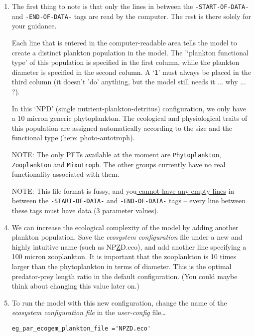 \documentclass[11pt,fleqn]{book} %
\begin{document}
\begin{enumerate}[noitemsep]
\vspace{1mm}
\item The first thing to note is that only the lines in between the \texttt{\small -START-OF-DATA-} and \texttt{\small -END-OF-DATA-} tags are read by the computer. The rest is there solely for your guidance.

Each line that is entered in the computer-readable area tells the model to create a distinct plankton population in the model. The '`plankton functional type' of this population is specified in the first column, while the plankton diameter is specified in the second column. A `\texttt{1}' must always be placed in the third column (it doesn't 'do' anything, but the model still needs it ...  why ... ?).

In this `NPD' (single nutrient-plankton-detritus) configuration, we only have a 10 micron generic phytoplankton. The ecological and physiological traits of this population are assigned automatically according to the size and the functional type (here: photo-autotroph).

\item[NOTE:] The only PFTs available at the moment are \texttt{Phytoplankton}, \texttt{Zooplankton} and \texttt{Mixotroph}. The other groups currently have no real functionality associated with them.

\item[NOTE:] This file format is fussy, and you\uline{ cannot have any empty lines} in between the  \texttt{\small -START-OF-DATA-} and \texttt{\small -END-OF-DATA-} tags -- every line between these tags must have data (3 parameter values).

\vspace{1mm}
\item We can increase the ecological complexity of the model by adding another plankton population. Save the \textit{ecosystem configuration} file under a new and highly intuitive name (such as \textsf{\footnotesize NP\underline{Z}D.eco}), and add another line specifying a 100 micron zooplankton. It is important that the zooplankton is 10 times larger than the phytoplankton in terms of diameter. This is the optimal predator-prey length ratio in the default configuration. (You could maybe think about changing this value later on.)

\vspace{1mm}
\item  To run the model with this new configuration, change the name of the \textit{ecosystem configuration file} in the \textit{user-config} file\dots
\small\begin{verbatim}
eg_par_ecogem_plankton_file ='NPZD.eco'
\end{verbatim}\normalsize


\end{enumerate}
\end{document}
